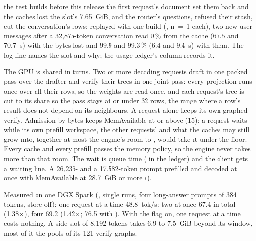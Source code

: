 the test builds before this release the first request's document set them back and the caches lost the slot's 7.65~GiB, and the router's questions, refused their stash, cut the conversation's rows: replayed with one build (\measured, n~=~1 each), two new user messages after a 32,875-token conversation read 0\,\% from the cache (67.5 and 70.7~s) with the bytes lost and 99.9 and 99.3\,\% (6.4 and 9.4~s) with them. The \code{[parallel]} log line names the slot and why; the usage ledger's  column records it.

The GPU is shared in turns. Two or more decoding requests draft in one packed pass over the drafter and verify their trees in one joint pass: every projection runs once over all their rows, so the weights are read once, and each request's tree is cut to its share so the pass stays at or under 32 rows, the range where a row's result does not depend on its neighbours. A request alone keeps its own graphed verify. Admission by bytes keeps MemAvailable at or above  (15): a request waits while its own prefill workspace, the other requests' and what the caches may still grow into, together at most the engine's room to , would take it under the floor. Every cache and every prefill passes the memory policy, so the engine never takes more than that room. The wait is queue time ( in the ledger) and the client gets a waiting line. A 26,236- and a 17,582-token prompt prefilled and decoded at once with MemAvailable at 28.7~GiB or more (\measured).

Measured on one DGX Spark (\measured, single runs, four long-answer prompts of 384 tokens, store off): one request at a time 48.8~tok/s; two at once 67.4 in total (1.38$\times$), four 69.2 (1.42$\times$; 76.5 with ). With the flag on, one request at a time costs nothing. A side slot of 8,192 tokens takes 6.9 to 7.5~GiB beyond its window, most of it the pools of its 121 verify graphs.

